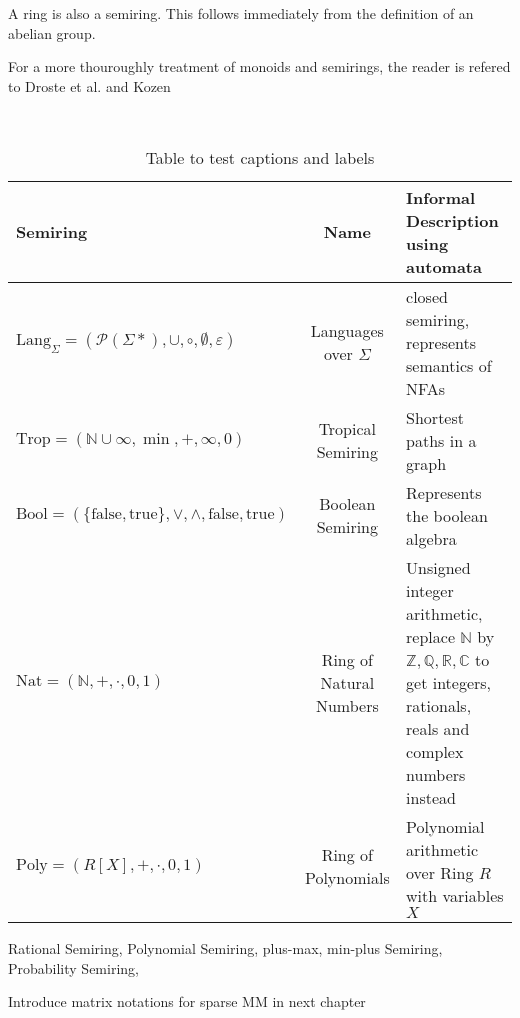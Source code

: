             \begin{note}
            A ring is also a semiring. This follows immediately from the definition of an abelian group.
            \end{note}
            
            For a more thouroughly treatment of monoids and semirings, the reader is refered to Droste et al. and Kozen~\autocite{HWA, CS}
                        
            \begin{example}~\autocite{WA}
                
                \begin{table}[htp]
                \centering
                \begin{tabular}{|l|c|p{6cm}|} 
                \hline
                Semiring & Name & Informal Description using automata \\ [0.5ex] 
                \hline\hline
                $\text{Lang}_{\Sigma}=(\mathcal{P}(\Sigma*), \cup, \circ, \emptyset, \varepsilon)$ & Languages over $\Sigma$ & closed semiring, represents semantics of NFAs \\ 
                $\text{Trop}=(\mathbb{N} \cup \infty, \min, +, \infty, 0)$ & Tropical Semiring & Shortest paths in a graph \\ 
                $\text{Bool}=(\{ \text{false}, \text{true}\}, \vee, \wedge, \text{false}, \text{true})$ & Boolean Semiring & Represents the boolean algebra \\ 
                $\text{Nat}=(\mathbb{N}, +, \cdot, 0, 1)$ & Ring of Natural Numbers & Unsigned integer arithmetic, replace $\mathbb{N}$ by $\mathbb{Z}, \mathbb{Q}, \mathbb{R}, \mathbb{C}$ to get integers, rationals, reals and complex numbers instead \\ 
                $\text{Poly}=(R[X], +, \cdot, 0, 1)$ & Ring of Polynomials & Polynomial arithmetic over Ring $R$ with variables $X$ \\ 
                
                
                \hline
                \end{tabular}
                \caption{Table to test captions and labels}
                \label{table:1}
                \end{table}
Rational Semiring, Polynomial Semiring, plus-max, min-plus Semiring, Probability Semiring, 
            \end{example}
            
            Introduce matrix notations for sparse MM in next chapter
            

